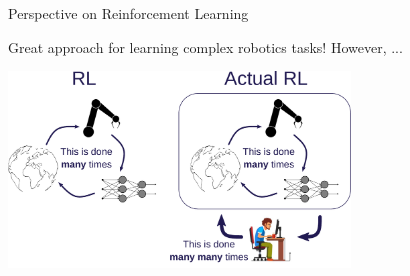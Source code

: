 \begin{frame}{Perspective on Reinforcement Learning}{}
    \centering
    \begin{block}{Great approach for learning complex robotics tasks! However, ...}\end{block}
    
    \vspace{0.2cm}
    
    \includegraphics[height=5.2cm]{graphics/actual_rl.pdf}
\end{frame}
